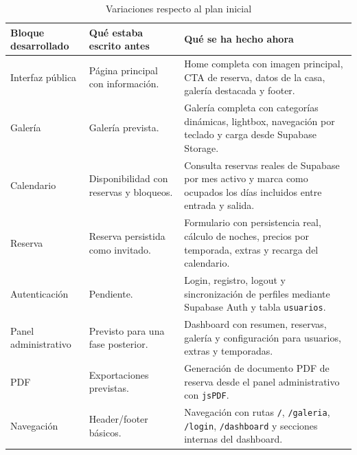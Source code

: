 \documentclass[11pt,a4paper]{article}
\begin{document}
\begin{table}[H]
	\centering
	\small
	\renewcommand{\arraystretch}{1.25}
	\setlength{\tabcolsep}{4pt}
	
	\begin{tabularx}{\textwidth}{|p{2.7cm}|X|X|}
		\hline
		\textbf{Bloque desarrollado} & \textbf{Qué estaba escrito antes} & \textbf{Qué se ha hecho ahora} \\
		\hline
		
		Interfaz pública & Página principal con información. & Home completa con imagen principal, CTA de reserva, datos de la casa, galería destacada y footer. \\
		\hline
		
		Galería & Galería prevista. & Galería completa con categorías dinámicas, lightbox, navegación por teclado y carga desde Supabase Storage. \\
		\hline
		
		Calendario & Disponibilidad con reservas y bloqueos. & Consulta reservas reales de Supabase por mes activo y marca como ocupados los días incluidos entre entrada y salida. \\
		\hline
		
		Reserva & Reserva persistida como invitado. & Formulario con persistencia real, cálculo de noches, precios por temporada, extras y recarga del calendario. \\
		\hline
		
		Autenticación & Pendiente. & Login, registro, logout y sincronización de perfiles mediante Supabase Auth y tabla \texttt{usuarios}. \\
		\hline
		
		Panel administrativo & Previsto para una fase posterior. & Dashboard con resumen, reservas, galería y configuración para usuarios, extras y temporadas. \\
		\hline
		
		PDF & Exportaciones previstas. & Generación de documento PDF de reserva desde el panel administrativo con \texttt{jsPDF}. \\
		\hline
		
		Navegación & Header/footer básicos. & Navegación con rutas \texttt{/}, \texttt{/galeria}, \texttt{/login}, \texttt{/dashboard} y secciones internas del dashboard. \\
		\hline
		
	\end{tabularx}
	
	\caption{Variaciones respecto al plan inicial}
\end{table}
\end{document}
